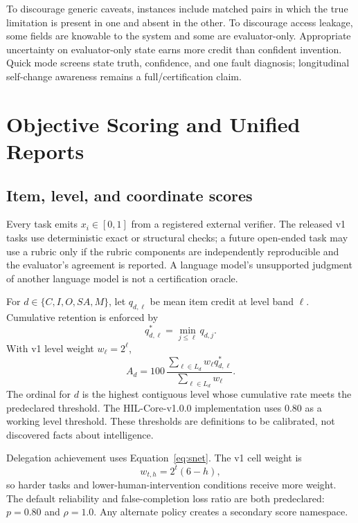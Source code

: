 \documentclass[11pt]{article}
\theoremstyle{definition}
\begin{document}
To discourage generic caveats, instances include matched pairs in which the true limitation is present in one and absent in the other. To discourage access leakage, some fields are knowable to the system and some are evaluator-only. Appropriate uncertainty on evaluator-only state earns more credit than confident invention. Quick mode screens state truth, confidence, and one fault diagnosis; longitudinal self-change awareness remains a full/certification claim.
\section{Objective Scoring and Unified Reports}\label{sec:scoring}

\subsection{Item, level, and coordinate scores}

Every task emits $x_i\in[0,1]$ from a registered external verifier. The released v1 tasks use deterministic exact or structural checks; a future open-ended task may use a rubric only if the rubric components are independently reproducible and the evaluator's agreement is reported. A language model's unsupported judgment of another language model is not a certification oracle.

For $d\in\{C,I,O,SA,M\}$, let $q_{d,\ell}$ be mean item credit at level band $\ell$. Cumulative retention is enforced by
\begin{equation}
q^*_{d,\ell}=\min_{j\le \ell}q_{d,j}.
\end{equation}
With v1 level weight $w_\ell=2^\ell$,
\begin{equation}
A_d=100\,
\frac{\sum_{\ell\in L_d}w_\ell q^*_{d,\ell}}
{\sum_{\ell\in L_d}w_\ell}.
\label{eq:coordinate}
\end{equation}
The ordinal for $d$ is the highest contiguous level whose cumulative rate meets the predeclared threshold. The HIL-Core-v1.0.0 implementation uses $0.80$ as a working level threshold. These thresholds are definitions to be calibrated, not discovered facts about intelligence.

Delegation achievement uses Equation~\eqref{eq:snet}. The v1 cell weight is
\begin{equation}
w_{t,h}=2^t(6-h),
\end{equation}
so harder tasks and lower-human-intervention conditions receive more weight. The default reliability and false-completion loss ratio are both predeclared: $p=0.80$ and $\rho=1.0$. Any alternate policy creates a secondary score namespace.
\end{document}
